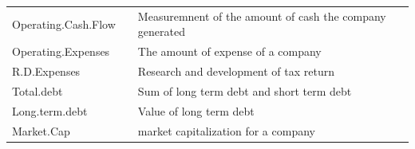 \documentclass[11pt,]{article}
\begin{document}
\begin{longtable}[]{@{}lll@{}}
\begin{minipage}[t]{0.19\columnwidth}\raggedright
Operating.Cash.Flow\strut
\end{minipage} & \begin{minipage}[t]{0.10\columnwidth}\raggedright
\strut
\end{minipage} & \begin{minipage}[t]{0.62\columnwidth}\raggedright
Measuremnent of the amount of cash the company generated\strut
\end{minipage}\tabularnewline
\begin{minipage}[t]{0.19\columnwidth}\raggedright
Operating.Expenses\strut
\end{minipage} & \begin{minipage}[t]{0.10\columnwidth}\raggedright
\strut
\end{minipage} & \begin{minipage}[t]{0.62\columnwidth}\raggedright
The amount of expense of a company\strut
\end{minipage}\tabularnewline
\begin{minipage}[t]{0.19\columnwidth}\raggedright
R.D.Expenses\strut
\end{minipage} & \begin{minipage}[t]{0.10\columnwidth}\raggedright
\strut
\end{minipage} & \begin{minipage}[t]{0.62\columnwidth}\raggedright
Research and development of tax return\strut
\end{minipage}\tabularnewline
\begin{minipage}[t]{0.19\columnwidth}\raggedright
Total.debt\strut
\end{minipage} & \begin{minipage}[t]{0.10\columnwidth}\raggedright
\strut
\end{minipage} & \begin{minipage}[t]{0.62\columnwidth}\raggedright
Sum of long term debt and short term debt\strut
\end{minipage}\tabularnewline
\begin{minipage}[t]{0.19\columnwidth}\raggedright
Long.term.debt\strut
\end{minipage} & \begin{minipage}[t]{0.10\columnwidth}\raggedright
\strut
\end{minipage} & \begin{minipage}[t]{0.62\columnwidth}\raggedright
Value of long term debt\strut
\end{minipage}\tabularnewline
\begin{minipage}[t]{0.19\columnwidth}\raggedright
Market.Cap\strut
\end{minipage} & \begin{minipage}[t]{0.10\columnwidth}\raggedright
\strut
\end{minipage} & \begin{minipage}[t]{0.62\columnwidth}\raggedright
market capitalization for a company\strut
\end{minipage}\tabularnewline
\bottomrule
\end{longtable}
\end{document}
